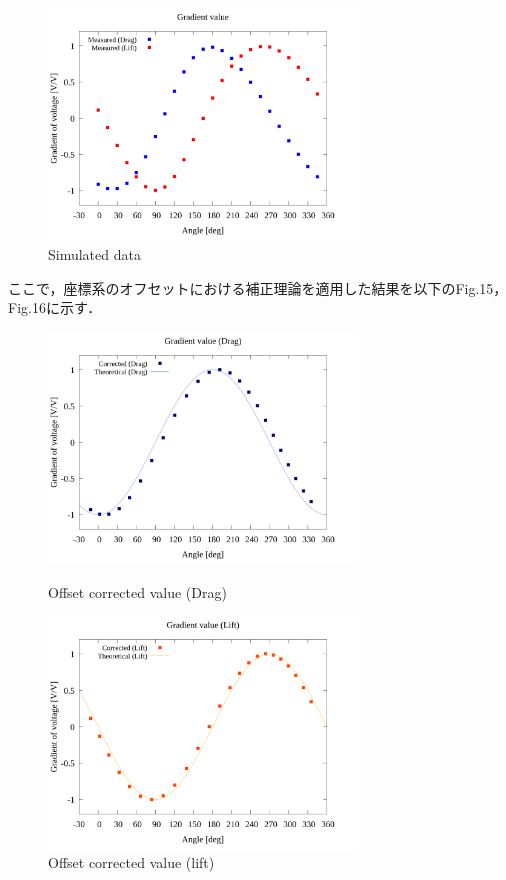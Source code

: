 \documentclass[twocolumn,a4j]{jsarticle}
\begin{document}
\begin{figure}[htbp]
    \footnotesize
    \begin{center}
        \includegraphics[width=82mm]{../../../02_workspace/result/simulation_tx=10.0_ty=-5.0_dx=5.00_dy=-2.50/plot/05/05_summary-wave.png}
        \caption{Simulated data}
    \end{center}
\end{figure}

ここで，座標系のオフセットにおける補正理論を適用した結果を以下のFig.15，Fig.16に示す．

\begin{figure}[htbp]
    \begin{center}
        \includegraphics[width=82mm]{../../../02_workspace/result/simulation_tx=10.0_ty=-5.0_dx=5.00_dy=-2.50/plot/21/21-2_corrected_offset_drag.png}
        \caption{Offset corrected value (Drag)}
        \includegraphics[width=82mm]{../../../02_workspace/result/simulation_tx=10.0_ty=-5.0_dx=5.00_dy=-2.50/plot/21/21-2_corrected_offset_lift.png}
        \caption{Offset corrected value (lift)}
    \end{center}
\end{figure}
\end{document}
